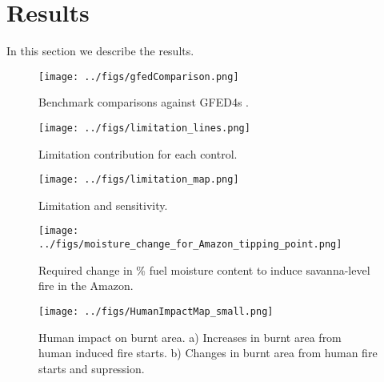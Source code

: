 \section{Results}\label{results}
In this section we describe the results.


\begin{figure}[!ht]
  \centering
    \texttt{[image: ../figs/gfedComparison.png]}
  \caption{Benchmark comparisons against GFED4s \citep{Giglio2013}.}
\end{figure}


\begin{figure}[!ht]
  \centering
    \texttt{[image: ../figs/limitation\_lines.png]}

  \caption{Limitation contribution for each control.}
\end{figure}



\begin{figure}[!ht]
  \centering
    \texttt{[image: ../figs/limitation\_map.png]}

  \caption{Limitation and sensitivity.}
\end{figure}

\begin{figure}[!ht]
  \centering
    \texttt{[image: ../figs/moisture\_change\_for\_Amazon\_tipping\_point.png]}

  \caption{Required change in \% fuel moisture content to induce savanna-level fire in the Amazon.}
\end{figure}



\begin{figure}[!ht]
  \centering
    \texttt{[image: ../figs/HumanImpactMap\_small.png]}

  \caption{Human impact on burnt area.
            a) Increases in burnt area from human induced fire starts.
            b) Changes in burnt area from human fire starts and supression.}
\end{figure}


